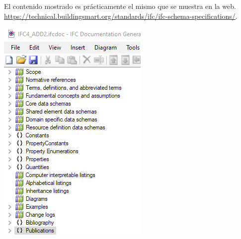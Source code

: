 \documentclass[spanish,10pt,a4paper,final,oneside]{article}
\begin{document}
El contenido mostrado es prácticamente el mismo que se muestra en la web.
\\ \url{https://technical.buildingsmart.org/standards/ifc/ifc-schema-specifications/}. 



\includegraphics[scale=0.9]{ifcDOC vs web - contenido ifcDOC}
\end{document}
